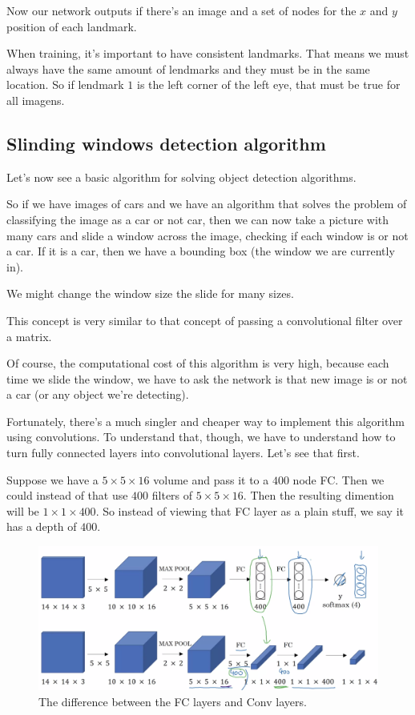 \documentclass[12pt, a4paper, oneside]{book}
\begin{document}
Now our network outputs if there's an image and a set of nodes for the $x$ and
$y$ position of each landmark.

When training, it's important to have consistent landmarks. That means we must
always have the same amount of lendmarks and they must be in the same location.
So if lendmark $1$ is the left corner of the left eye, that must be true for all
imagens.

\subsection{Slinding windows detection algorithm}%
\label{sub:slinding_windows_detection_algorithm}

Let's now see a basic algorithm for solving object detection algorithms.

So if we have images of cars and we have an algorithm that solves the problem of
classifying the image as a car or not car, then we can now take a picture with
many cars and slide a window across the image, checking if each window is or not
a car. If it is a car, then we have a bounding box (the window we are currently
in).

We might change the window size the slide for many sizes.

This concept is very similar to that concept of passing a convolutional filter
over a matrix.

Of course, the computational cost of this algorithm is very high, because each
time we slide the window, we have to ask the network is that new image is or not
a car (or any object we're detecting).

Fortunately, there's a much singler and cheaper way to implement this algorithm
using convolutions. To understand that, though, we have to understand how to
turn fully connected layers into convolutional layers. Let's see that first.

Suppose we have a $5\times 5\times 16$ volume and pass it to a $400$ node FC.
Then we could instead of that use $400$ filters of $5\times 5\times 16$. Then
the resulting dimention will be $1\times 1\times 400$. So instead of viewing
that FC layer as a plain stuff, we say it has a depth of $400$.

\begin{figure}[h]
\centering
\includegraphics[scale=0.4]{Res/fc_into_conv_layers.png}
\caption{The difference between the FC layers and Conv layers.}
\label{fc_into_conv_layers.png}
\end{figure}
\end{document}
